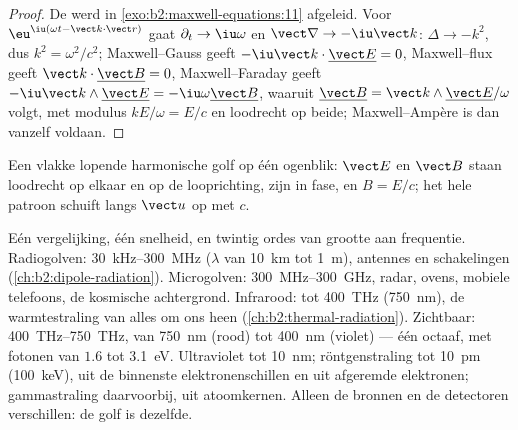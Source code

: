 \begin{proof}
De  werd in \cref{exo:b2:maxwell-equations:11} afgeleid.
Voor $\eu^{\iu(\omega t - \vect k\cdot\vect r)}$ gaat
$\partial_t \to \iu\omega$ en $\vect\nabla \to
-\iu\vect k$:
$\Delta \to -k^2$, dus $k^2 = \omega^2/c^2$; Maxwell--Gauss geeft
$-\iu
\vect k\cdot\underline{\vect E} = 0$, Maxwell--flux geeft
$\vect k\cdot\underline{\vect B} = 0$, Maxwell--Faraday geeft
$-\iu\vect k\wedge\underline{\vect E} = -\iu\omega\underline{\vect B}$,
waaruit $\underline{\vect B} = \vect k\wedge\underline{\vect E}/\omega$
volgt, met modulus $kE/\omega = E/c$ en loodrecht op beide; Maxwell--Ampère
is dan vanzelf voldaan.
\end{proof}

\begin{omfigure}

{\small Een vlakke lopende harmonische golf op één ogenblik: $\vect E$ en
$\vect B$ staan loodrecht op elkaar en op de looprichting, zijn in fase, en
$B = E/c$; het hele patroon schuift langs $\vect u$ op met $c$.}
\end{omfigure}

\begin{remark}\label{rem:b2:plane-waves-polarization:spectrum}
Eén vergelijking, één snelheid, en twintig ordes van grootte aan frequentie.
Radiogolven: \qty{30}{kHz}--\qty{300}{MHz} ($\lambda$ van \qty{10}{km} tot
\qty{1}{m}), antennes en schakelingen (\cref{ch:b2:dipole-radiation}).
Microgolven: \qty{300}{MHz}--\qty{300}{GHz}, radar, ovens, mobiele
telefoons, de kosmische achtergrond. Infrarood: tot \qty{400}{THz}
(\qty{750}{nm}), de warmtestraling van alles om ons heen
(\cref{ch:b2:thermal-radiation}). Zichtbaar: \qty{400}{THz}--\qty{750}{THz},
van \qty{750}{nm} (rood) tot \qty{400}{nm} (violet) --- één octaaf, met
fotonen van $1.6$ tot \qty{3.1}{eV}. Ultraviolet tot \qty{10}{nm};
röntgenstraling tot \qty{10}{pm} (\qty{100}{keV}), uit de binnenste
elektronenschillen en uit afgeremde elektronen; gammastraling daarvoorbij,
uit atoomkernen. Alleen de bronnen en de detectoren verschillen: de golf is
dezelfde.
\end{remark}

